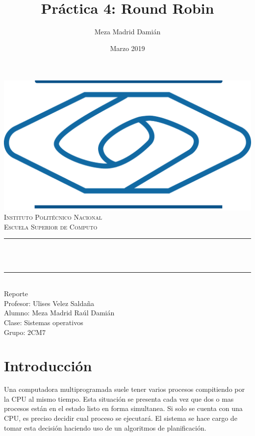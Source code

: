 \documentclass[12pt]{article}
\title{Práctica 4: Round Robin}%
\author{Meza Madrid Damián}%
\date{Marzo 2019}%
\makeatletter
\let\thetitle\@title
\makeatother
\begin{document}

\begin{titlepage}
	\centering
    \vspace*{0.5 cm}
    \includegraphics[scale = 0.30]{escom.png}\\[1.0 cm]	%
	\textsc{\Large Instituto Politécnico Nacional}\\[0.5 cm]%
	\textsc{\Large Escuela Superior de Computo}\\[0.5 cm]%
	\rule{\linewidth}{0.2 mm} \\[0.4 cm]
	{ \huge \bfseries \thetitle}\\
	\rule{\linewidth}{0.2 mm} \\[1.5 cm]
	Reporte\\
	Profesor: Ulises Velez Saldaña \\
	Alumno: Meza Madrid Raúl Damián\\
    Clase: Sistemas operativos\\
    Grupo: 2CM7\\
\end{titlepage}
\tableofcontents
\pagebreak
\section{Introducción}
Una computadora multiprogramada suele tener varios procesos compitiendo por la CPU al mismo tiempo. Esta situación se presenta cada vez que dos o mas procesos están en el estado listo en forma simultanea. Si solo se cuenta con una CPU, es preciso decidir cual proceso se ejecutará. El sistema se hace cargo de tomar esta decisión haciendo uso de un algoritmos de planificación. 
\end{document}
